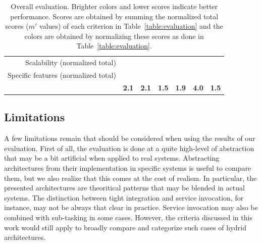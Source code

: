 \documentclass[preprint,3p,twocolumn]{elsarticle}
\begin{document}
\begin{table}
\begin{tabular}{rcccccc}
Scalability (normalized total)  & \cellcolor[HTML]{999999}{1.00}
                                     & \cellcolor[HTML]{99CC99}{0.50}
                                     & \cellcolor[HTML]{99CC99}{0.50}
                                     & \cellcolor[HTML]{99FF99}{0.00}
                                     & \cellcolor[HTML]{99CC99}{0.50}
                                     & \cellcolor[HTML]{99CC99}{0.50}\\
Specific features (normalized total) & \cellcolor[HTML]{99CC99}{0.50}
                                     & \cellcolor[HTML]{99CC99}{0.50}
                                     & \cellcolor[HTML]{999999}{1.00}
                                     & \cellcolor[HTML]{99CC99}{0.50}
                                     & \cellcolor[HTML]{99CC99}{0.50}
                                     & \cellcolor[HTML]{99DD99}{0.00}\\
                                    & \cellcolor[HTML]{99E699}\textbf{2.1}
                                    & \cellcolor[HTML]{99E699}\textbf{2.1}
                                    & \cellcolor[HTML]{99FE99}\textbf{1.5}
                                    & \cellcolor[HTML]{99EE99}\textbf{1.9}
                                    & \cellcolor[HTML]{999999}\textbf{4.0}
                                    & \cellcolor[HTML]{99FF99}\textbf{1.5}\\
\end{tabular}
\caption{Overall evaluation. Brighter colors and lower scores indicate better performance. Scores
  are obtained by summing the normalized total scores ($m'$ values) of
  each criterion in Table~\ref{table:evaluation} and the colors are obtained by normalizing these scores
  as done in Table~\ref{table:evaluation}. }
\label{table:overall}
\end{table}

\subsection{Limitations}

A few limitations remain that should be considered when using the
results of our evaluation. First of all, the evaluation is done at a
quite high-level of abstraction that may be a bit artificial when
applied to real systems. Abstracting architectures from their
implementation in specific systems is useful to compare them, but we
also realize that this comes at the cost of realism. In particular,
the presented architectures are theoritical patterns that may be blended in
actual systems. The distinction between tight integration and service
invocation, for instance, may not be always that clear in practice. Service
invocation may also be combined with sub-tasking in some cases. However, the
criteria discussed in this work would still apply to broadly compare and categorize
such cases of hydrid architectures.
\end{document}
